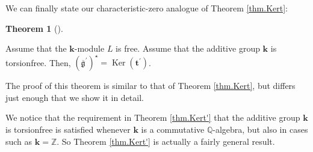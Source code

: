 \documentclass[numbers=enddot,12pt,final,onecolumn,notitlepage]{scrartcl}%
\theoremstyle{definition}
\newtheorem{theo}{Theorem}[section]
\newenvironment{theorem}[1][]
{\begin{theo}[#1]\begin{leftbar}}
{\end{leftbar}\end{theo}}
\begin{document}
We can finally state our characteristic-zero analogue of Theorem
\ref{thm.Kert}:

\begin{theorem}
\label{thm.Kert'}Assume that the $\mathbf{k}$-module $L$ is free. Assume that
the additive group $\mathbf{k}$ is torsionfree. Then, $\left(  \overline
{\mathfrak{g}}^{\prime}\right)  ^{\star}=\operatorname*{Ker}\left(
\mathbf{t}^{\prime}\right)  $.
\end{theorem}

The proof of this theorem is similar to that of Theorem \ref{thm.Kert}, but
differs just enough that we show it in detail.

We notice that the requirement in Theorem \ref{thm.Kert'} that the additive
group $\mathbf{k}$ is torsionfree is satisfied whenever $\mathbf{k}$ is a
commutative $\mathbb{Q}$-algebra, but also in cases such as $\mathbf{k}%
=\mathbb{Z}$. So Theorem \ref{thm.Kert'} is actually a fairly general result.
\end{document}
